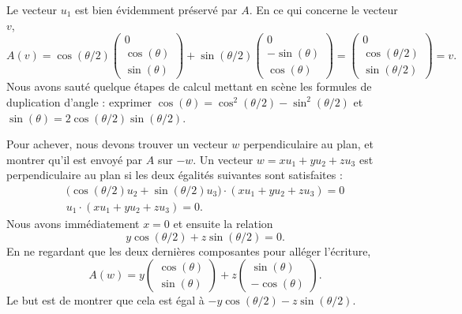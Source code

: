 \begin{subproof}
        Le vecteur \( u_1\) est bien évidemment préservé par \( A\). En ce qui concerne le vecteur \( v\),
        \begin{equation}
            A(v)=\cos(\theta/2)\begin{pmatrix}
                0    \\ 
                \cos(\theta)    \\ 
                \sin(\theta)    
            \end{pmatrix}+\sin(\theta/2)\begin{pmatrix}
                0    \\ 
                -\sin(\theta)    \\ 
                \cos(\theta)    
            \end{pmatrix}=
            \begin{pmatrix}
                0    \\ 
                \cos(\theta/2)    \\ 
                \sin(\theta/2)    
            \end{pmatrix}=v.
        \end{equation}
        Nous avons sauté quelque étapes de calcul mettant en scène les formules de duplication d'angle : exprimer \( \cos(\theta)=\cos^2(\theta/2)-\sin^2(\theta/2)\) et \( \sin(\theta)=2\cos(\theta/2)\sin(\theta/2)\).

        Pour achever, nous devons trouver un vecteur \( w\) perpendiculaire au plan, et montrer qu'il est envoyé par \( A\) sur \( -w\). Un vecteur \( w=xu_1+yu_2+zu_3\) est perpendiculaire au plan si les deux égalités suivantes sont satisfaites :
        \begin{subequations}
            \begin{align}
                \big( \cos(\theta/2)u_2+\sin(\theta/2)u_3 \big)\cdot (xu_1+yu_2+zu_3)=0\\
                u_1\cdot(xu_1+yu_2+zu_3)=0.
            \end{align}
        \end{subequations}
        Nous avons immédiatement \( x=0\) et ensuite la relation
        \begin{equation}        \label{EQooXQMDooTvwrWk}
            y\cos(\theta/2)+z\sin(\theta/2)=0.
        \end{equation}
        En ne regardant que les deux dernières composantes pour alléger l'écriture,
        \begin{equation}
            A(w)=y\begin{pmatrix}
                \cos(\theta)    \\ 
                \sin(\theta)    
            \end{pmatrix}+z\begin{pmatrix}
                \sin(\theta)    \\ 
                -\cos(\theta)    
            \end{pmatrix}.
        \end{equation}
        Le but est de montrer que cela est égal à \( -y\cos(\theta/2)-z\sin(\theta/2)\).


\end{subproof}

